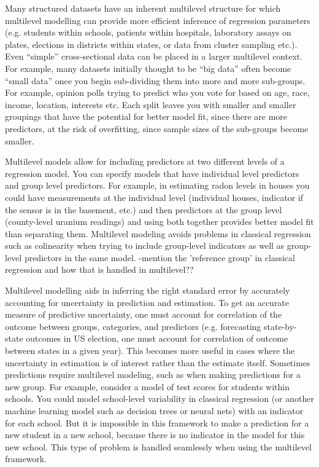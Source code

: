 Many structured datasets have an inherent multilevel structure for which multilevel modelling can provide more efficient inference of regression parameters (e.g. students within schools, patients within hospitals, laboratory assays on plates, elections in districts within states, or data from cluster sampling etc.). Even “simple” cross-sectional data can be placed in a larger multilevel context. For example, many datasets initially thought to be “big data” often become “small data” once you begin sub-dividing them into more and more sub-groups. For example, opinion polls trying to predict who you vote for based on age, race, income, location, interests etc. Each split leaves you with smaller and smaller groupings that have the potential for better model fit, since there are more predictors, at the risk of overfitting, since sample sizes of the sub-groups become smaller.

Multilevel models allow for including predictors at two different levels of a regression model. You can specify models that have individual level predictors and group level predictors. For example, in estimating radon levels in houses you could have measurements at the individual level (individual houses, indicator if the sensor is in the basement, etc.) and then predictors at the group level (county-level uranium readings) and using both together provides better model fit than separating them. Multilevel modeling avoids problems in classical regression such as colinearity when trying to include group-level indicators as well as group-level predictors in the same model. -mention the 'reference group' in classical regression and how that is handled in multilevel??

Multilevel modelling aids in inferring the right standard error by accurately accounting for uncertainty in prediction and estimation. To get an accurate measure of predictive uncertainty, one must account for correlation of the outcome between groups, categories, and predictors (e.g. forecasting state-by-state outcomes in US election, one must account for correlation of outcome between states in a given year). This becomes more useful in cases where the uncertainty in estimation is of interest rather than the estimate itself. Sometimes predictions require multilevel modeling, such as when making predictions for a new group. For example, consider a model of test scores for students within schools. You could model school-level variability in classical regression (or another machine learning model such as decision trees or neural nets) with an indicator for each school. But it is impossible in this framework to make a prediction for a new student in a new school, because there is no indicator in the model for this new school. This type of problem is handled seamlessly when using the multilevel framework.

